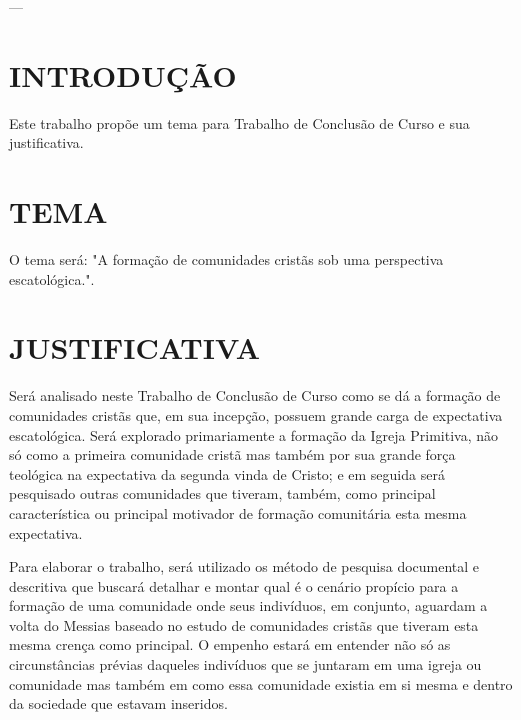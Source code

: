 \documentclass[
    article,            %
	12pt,				%
	oneside,			%
	a4paper,			%
	english,			%
	french,				%
	spanish,			%
	brazil				%
	]{abntex2}
\begin{document}



\imprimircapa

\imprimirfolhaderosto

---
\tableofcontents*
\cleardoublepage

\textual

\section{INTRODUÇÃO}
Este trabalho propõe um tema para Trabalho de Conclusão de Curso e sua justificativa.

\section{TEMA}
O tema será: "A formação de comunidades cristãs sob uma perspectiva escatológica.".

\section{JUSTIFICATIVA}
Será analisado neste Trabalho de Conclusão de Curso como se dá a formação de comunidades cristãs que, em sua incepção, possuem grande carga de expectativa escatológica. Será explorado primariamente a formação da Igreja Primitiva, não só como a primeira comunidade cristã mas também por sua grande força teológica na expectativa da segunda vinda de Cristo; e em seguida será pesquisado outras comunidades que tiveram, também, como principal característica ou principal motivador de formação comunitária esta mesma expectativa.

Para elaborar o trabalho, será utilizado os método de pesquisa documental e descritiva que buscará detalhar e montar qual é o cenário propício para a formação de uma comunidade onde seus indivíduos, em conjunto, aguardam a volta do Messias baseado no estudo de comunidades cristãs que tiveram esta mesma crença como principal. O empenho estará em entender não só as circunstâncias prévias daqueles indivíduos que se juntaram em uma igreja ou comunidade mas também em como essa comunidade existia em si mesma e dentro da sociedade que estavam inseridos.
\end{document}
